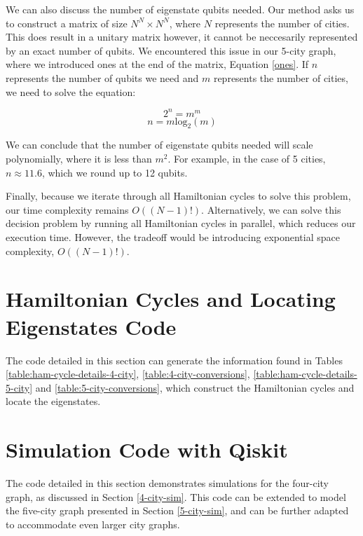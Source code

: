 \documentclass[msc,oneside]{ubcthesis}
\begin{document}
We can also discuss the number of eigenstate qubits needed. Our method asks us to construct a matrix of size $N^N \times N^N$, where $N$ represents the number of cities. This does result in a unitary matrix however, it cannot be neccesarily represented by an exact number of qubits. We encountered this issue in our 5-city graph, where we introduced ones at the end of the matrix, Equation \eqref{ones}. If $n$ represents the number of qubits we need and $m$ represents the number of cities, we need to solve the equation:

$$2^n = m^m$$
$$n = m\mathrm{log}_2(m)$$

We can conclude that the number of eigenstate qubits needed will scale polynomially, where it is less than $m^2$. For example, in the case of 5 cities, $n \approx 11.6$, which we round up to 12 qubits.

Finally, because we iterate through all Hamiltonian cycles to solve this problem, our time complexity remains $O((N-1)!)$. Alternatively, we can solve this decision problem by running all Hamiltonian cycles in parallel, which reduces our execution time. However, the tradeoff would be introducing exponential space complexity, $O((N-1)!)$.
	
	

	

	\appendix
	\chapter{Hamiltonian Cycles and Locating Eigenstates Code}
	
	The code detailed in this section can generate the information found in Tables \ref{table:ham-cycle-details-4-city}, \ref{table:4-city-conversions},  \ref{table:ham-cycle-details-5-city} and \ref{table:5-city-conversions}, which construct the Hamiltonian cycles and locate the eigenstates. 
	
	
	\chapter{Simulation Code with Qiskit}
	
	The code detailed in this section demonstrates simulations for the four-city graph, as discussed in Section \ref{4-city-sim}. This code can be extended to model the five-city graph presented in Section \ref{5-city-sim}, and can be further adapted to accommodate even larger city graphs.
	
	
	
	\backmatter
	
	
	
\end{document}
